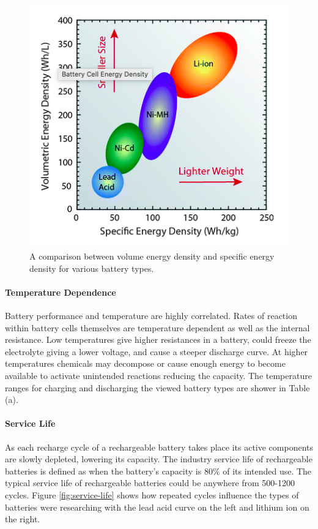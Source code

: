 \begin{figure}
    \centering
    \includegraphics[scale=0.4]{figures/energy density.png}
    \caption{A comparison between volume energy density and specific energy density for various battery types.}
    \label{fig:energy-density} 
\end{figure}

\paragraph{Temperature Dependence}
Battery performance and temperature are highly correlated. Rates of reaction within battery cells themselves are temperature dependent as well as the internal resistance. Low temperatures give higher resistances in a battery, could freeze the electrolyte giving a lower voltage, and cause a steeper discharge curve. At higher temperatures chemicals may decompose or cause enough energy to become available to activate unintended reactions reducing the capacity. The temperature ranges for charging and discharging the viewed battery types are shower in Table (a). 

\paragraph{Service Life}
As each recharge cycle of a rechargeable battery takes place its active components are slowly depleted, lowering its capacity. The industry service life of rechargeable batteries is defined as when the battery's capacity is 80\% of its intended use. The typical service life of rechargeable batteries could be anywhere from 500-1200 cycles. Figure \ref{fig:service-life} shows how repeated cycles influence the types of batteries were researching with the lead acid curve on the left and lithium ion on the right.

